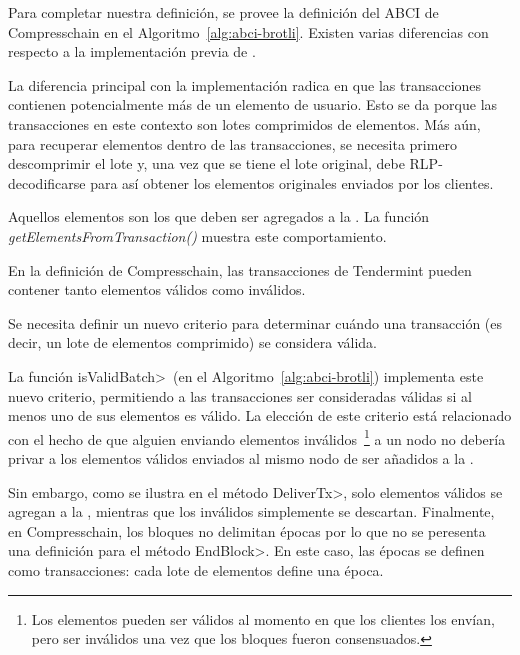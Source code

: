 
%
Para completar nuestra definición, se provee la definición del ABCI de Compresschain en el
Algoritmo~\ref{alg:abci-brotli}.
%
Existen varias diferencias con respecto a la implementación previa de \setchain.
%


La diferencia principal con la implementación \vanilla radica en que las transacciones contienen
potencialmente más de un elemento de usuario. Esto se da porque las transacciones en este contexto
son lotes comprimidos de elementos.
%
Más aún, para recuperar elementos dentro de las transacciones, se necesita primero descomprimir
el lote y, una vez que se tiene el lote original, debe RLP-decodificarse para así obtener los elementos
originales enviados por los clientes.

Aquellos elementos son los que deben ser agregados a la \setchain. La función \textit{getElementsFromTransaction()}
muestra este comportamiento.

En la definición de Compresschain, las transacciones de Tendermint pueden contener tanto elementos válidos
como inválidos.
%

Se necesita definir un nuevo criterio para determinar cuándo una transacción (es decir, un lote de elementos
comprimido) se considera válida.

%
La función \<isValidBatch>~(en el Algoritmo~\ref{alg:abci-brotli}) implementa este nuevo criterio, permitiendo
a las transacciones ser consideradas válidas si al menos uno de sus elementos es válido.
%
La elección de este criterio está relacionado con el hecho de que alguien enviando elementos inválidos~\footnote{
Los elementos pueden ser válidos al momento en que los clientes los envían, pero ser inválidos una vez que
los bloques fueron consensuados.} a un nodo no debería privar a los elementos válidos enviados al mismo nodo de
ser añadidos a la \setchain.

%
Sin embargo, como se ilustra en el método \<DeliverTx>, solo elementos válidos se agregan a la \setchain,
mientras que los inválidos simplemente se descartan.
%
Finalmente, en Compresschain, los bloques no delimitan épocas por lo que no se peresenta una definición para
el método \<EndBlock>.
En este caso, las épocas se definen como transacciones: cada lote de elementos define una época.

